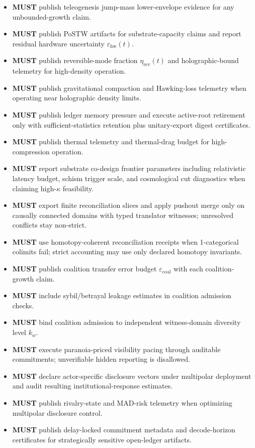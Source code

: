 \documentclass[11pt,a4paper]{article}
\newcommand{\MUST}{\textbf{MUST}}
\newcommand{\eps}{\varepsilon}
\theoremstyle{definition}
\theoremstyle{remark}
\begin{document}
\begin{itemize}
  \item \MUST{} publish teleogenesis jump-mass lower-envelope evidence for any unbounded-growth claim.
  \item \MUST{} publish PoSTW artifacts for substrate-capacity claims and report residual hardware uncertainty $\eps_{\mathrm{hw}}(t)$.
  \item \MUST{} publish reversible-mode fraction $\eta_{\mathrm{rev}}(t)$ and holographic-bound telemetry for high-density operation.
  \item \MUST{} publish gravitational compaction and Hawking-loss telemetry when operating near holographic density limits.
  \item \MUST{} publish ledger memory pressure and execute active-root retirement only with sufficient-statistics retention plus unitary-export digest certificates.
  \item \MUST{} publish thermal telemetry and thermal-drag budget for high-compression operation.
  \item \MUST{} report substrate co-design frontier parameters including relativistic latency budget, schism trigger scale, and cosmological cut diagnostics when claiming high-$\kappa$ feasibility.
  \item \MUST{} export finite reconciliation slices and apply pushout merge only on causally connected domains with typed translator witnesses; unresolved conflicts stay non-strict.
  \item \MUST{} use homotopy-coherent reconciliation receipts when 1-categorical colimits fail; strict accounting may use only declared homotopy invariants.
  \item \MUST{} publish coalition transfer error budget $\eps_{\mathrm{coal}}$ with each coalition-growth claim.
  \item \MUST{} include sybil/betrayal leakage estimates in coalition admission checks.
  \item \MUST{} bind coalition admission to independent witness-domain diversity level $k_w$.
  \item \MUST{} execute paranoia-priced visibility pacing through auditable commitments; unverifiable hidden reporting is disallowed.
  \item \MUST{} declare actor-specific disclosure vectors under multipolar deployment and audit resulting institutional-response estimates.
  \item \MUST{} publish rivalry-state and MAD-risk telemetry when optimizing multipolar disclosure control.
  \item \MUST{} publish delay-locked commitment metadata and decode-horizon certificates for strategically sensitive open-ledger artifacts.

\end{itemize}
\end{document}
